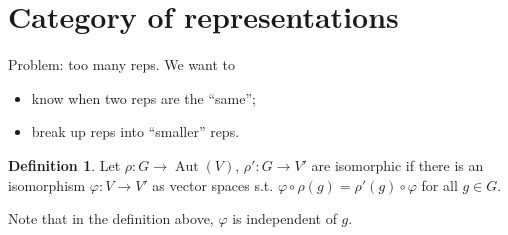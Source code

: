 \documentclass{article}
\theoremstyle{definition}
\newtheorem{defn}{Definition}[section]
\theoremstyle{remark}
\theoremstyle{plain}
\begin{document}
\section{Category of representations}
Problem: too many reps. We want to
\begin{itemize}
    \item know when two reps are the ``same'';
    \item break up reps into ``smaller'' reps.
\end{itemize}
\begin{defn}
    Let $\rho:G\to\operatorname{Aut}(V)$, $\rho':G\to V'$ are isomorphic if there is an isomorphism $\varphi:V\to V'$ as vector spaces s.t. $\varphi\circ\rho(g)=\rho'(g)\circ\varphi$ for all $g\in G$.
\end{defn}
Note that in the definition above, $\varphi$ is independent of $g$.
\end{document}
